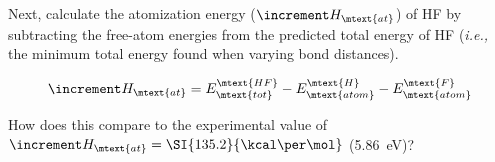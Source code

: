 \begin{enumerate}

Next, calculate the atomization energy (\( \increment H_\mtext{at} \)) of HF by subtracting the free-atom energies from the predicted total energy of HF (\emph{i.e.,} the minimum total energy found when varying bond distances).

\begin{equation}
 \increment H_\mtext{at}= E^\mtext{HF}_\mtext{tot} - E^\mtext{H}_\mtext{atom} - E^\mtext{F}_\mtext{atom}
\end{equation}

How does this compare to the experimental value of \(\increment H_\mtext{at}=\SI{135.2}{\kcal\per\mol}\) (\SI{5.86}{\eV})? 


\end{enumerate}
